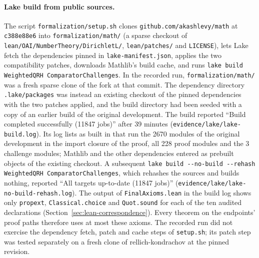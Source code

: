 \documentclass[11pt]{article}
\begin{document}
\paragraph{Lake build from public sources.}
The script \nolinkurl{formalization/setup.sh} clones
\nolinkurl{github.com/akashlevy/math} at \nolinkurl{c388e88e6} into
\nolinkurl{formalization/math/} (a sparse checkout of
\nolinkurl{lean/OAI/NumberTheory/DirichletL/}, \nolinkurl{lean/patches/}
and \nolinkurl{LICENSE}), lets Lake fetch the dependencies pinned in
\nolinkurl{lake-manifest.json}, applies the two compatibility patches,
downloads Mathlib's build cache, and runs
\texttt{lake build WeightedQRH ComparatorChallenges}. In the recorded
run, \nolinkurl{formalization/math/} was a fresh sparse clone of the
fork at that commit. The dependency directory \nolinkurl{.lake/packages}
was instead an existing checkout of the pinned dependencies with the two
patches applied, and the build directory had been seeded with a copy of
an earlier build of the original development. The build reported
``Build completed successfully (11847 jobs)'' after 39 minutes
(\nolinkurl{evidence/lake/lake-build.log}). Its log lists as built in
that run the 2670 modules of the original development in the import
closure of the proof, all 228 proof modules and the 3 challenge modules; Mathlib and the other dependencies entered as
prebuilt objects of the existing checkout. A subsequent
\texttt{lake build -{}-no-build -{}-rehash WeightedQRH ComparatorChallenges},
which rehashes the sources and builds nothing, reported ``All targets
up-to-date (11847 jobs)'' (\nolinkurl{evidence/lake/lake-no-build-rehash.log}).
The output of \nolinkurl{FinalAxioms.lean} in the build log shows only
\nolinkurl{propext}, \nolinkurl{Classical.choice} and
\nolinkurl{Quot.sound} for each of the ten audited declarations
(Section~\ref{sec:lean-correspondence}). Every theorem on the
endpoints' proof paths therefore uses at most these axioms. The recorded
run did not exercise the dependency fetch, patch and cache steps of
\nolinkurl{setup.sh}; its patch step was tested separately on a fresh
clone of rellich-kondrachov at the pinned revision.
\end{document}
